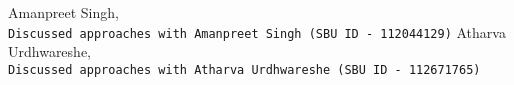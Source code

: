 \documentclass[11pt]{article}
\begin{document}
\clearpage

\begin{thebibliography}{9}
	Amanpreet Singh,
	\\\texttt{Discussed approaches with Amanpreet Singh (SBU ID - 112044129)}
	Atharva Urdhwareshe,
	\\\texttt{Discussed approaches with Atharva Urdhwareshe (SBU ID - 112671765)}
	
\end{thebibliography}
\end{document}

